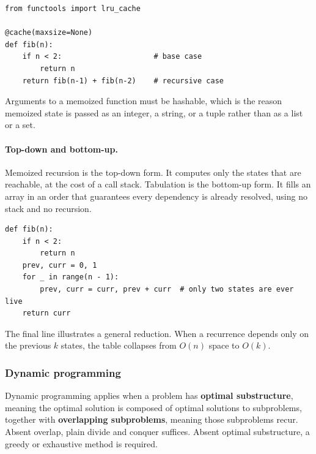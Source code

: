 \begin{lstlisting}[style=python, caption={Memoization by decorator}]
from functools import lru_cache

@cache(maxsize=None)     
def fib(n):
    if n < 2:                     # base case
        return n
    return fib(n-1) + fib(n-2)    # recursive case
\end{lstlisting}

Arguments to a memoized function must be hashable, which is the reason
memoized state is passed as an integer, a string, or a tuple rather than as a
list or a set.

\paragraph{Top-down and bottom-up.} Memoized recursion is the top-down form.
It computes only the states that are reachable, at the cost of a call stack.
Tabulation is the bottom-up form. It fills an array in an order that
guarantees every dependency is already resolved, using no stack and no
recursion.

\begin{lstlisting}[style=python, caption={The same recurrence, tabulated}]
def fib(n):
    if n < 2:
        return n
    prev, curr = 0, 1
    for _ in range(n - 1):
        prev, curr = curr, prev + curr  # only two states are ever live
    return curr
\end{lstlisting}

\vspace{-2ex}

The final line illustrates a general reduction. When a recurrence depends only
on the previous $k$ states, the table collapses from $O(n)$ space to $O(k)$.

\subsubsection*{Dynamic programming}

Dynamic programming applies when a problem has \textbf{optimal substructure},
meaning the optimal solution is composed of optimal solutions to subproblems,
together with \textbf{overlapping subproblems}, meaning those subproblems recur.
Absent overlap, plain divide and conquer suffices. Absent optimal substructure,
a greedy or exhaustive method is required.


